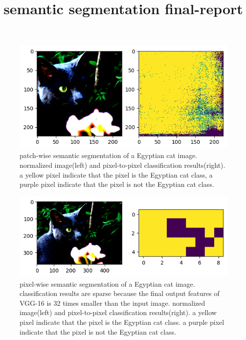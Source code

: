 \documentclass[extendedabs]{bmvc2k}
\begin{document}
\title{semantic segmentation final-report}

 

\maketitle
\noindent

\begin{figure}[t]
	\includegraphics[width=\linewidth]{images/fig1.png}
	\caption{
		patch-wise semantic segmentation of a Egyptian cat image. normalized image(left) and pixel-to-pixel classification results(right). a yellow pixel indicate that the pixel is the Egyptian cat class, a purple pixel indicate that the pixel is not the Egyptian cat class.}
        \label{fig:patch-wise}
	\vspace{-2mm}
\end{figure}
\begin{figure}[t]
	\includegraphics[width=\linewidth]{images/fig2.png}
	\caption{
		pixel-wise semantic segmentation of a Egyptian cat image. classification results are sparse because the final output features of VGG-16\cite{vggnet} is 32 times smaller than the input image. normalized image(left) and pixel-to-pixel classification results(right). a yellow pixel indicate that the pixel is the Egyptian cat class. a purple pixel indicate that the pixel is not the Egyptian cat class.}
        \label{fig:pixel-wise}
	\vspace{-2mm}
\end{figure}
\end{document}

